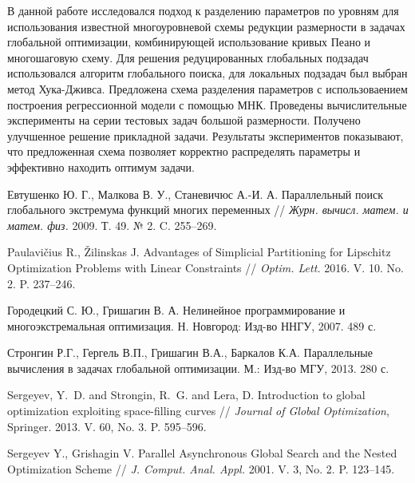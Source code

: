 \documentclass[11pt, oneside, a4paper]{article}
\begin{document}
В данной работе исследовался подход к разделению параметров по уровням для использования известной многоуровневой схемы редукции размерности в задачах глобальной оптимизации, комбинирующей использование кривых Пеано и многошаговую схему. Для решения редуцированных глобальных подзадач использовался алгоритм глобального поиска, для локальных подзадач был выбран метод Хука-Дживса. Предложена схема разделения параметров с использоваением построения регрессионной модели с помощью МНК. Проведены вычислительные эксперименты на серии тестовых задач большой размерности. Получено улучшенное решение прикладной задачи. Результаты экспериментов показывают, что предложенная схема позволяет корректно распределять параметры и эффективно находить оптимум задачи.

\begin{biblio}

 Евтушенко Ю. Г., Малкова В. У., Станевичюс А.-И. А. Параллельный поиск глобального экстремума функций многих переменных // {\it Журн. вычисл. матем. и матем. физ.} 2009. Т. 49. № 2. C. 255--269.

 Paulavi{\v c}ius R., {\v Z}ilinskas J. Advantages of Simplicial Partitioning for Lipschitz Optimization Problems with Linear Constraints // {\it Optim. Lett.} 2016. V. 10. No. 2. P. 237--246.

 Городецкий С. Ю., Гришагин В. А. Нелинейное программирование и многоэкстремальная оптимизация. Н. Новгород: Изд-во ННГУ, 2007. 489 с.

 Стронгин Р.Г., Гергель В.П., Гришагин В.А., Баркалов К.А. Параллельные вычисления в задачах глобальной оптимизации. М.: Изд-во МГУ, 2013. 280 с.

 Sergeyev, Y.~D. and Strongin, R.~G. and Lera, D. Introduction to global optimization exploiting space-filling curves // {\it Journal of Global Optimization}, Springer. 2013. V. 60, No. 3. P. 595--596.

 Sergeyev Y., Grishagin V. Parallel Asynchronous Global Search and the Nested Optimization Scheme //  {\it J. Comput. Anal. Appl.} 2001. V. 3, No. 2. P. 123--145.



\end{biblio}

\newpage
\end{document}
